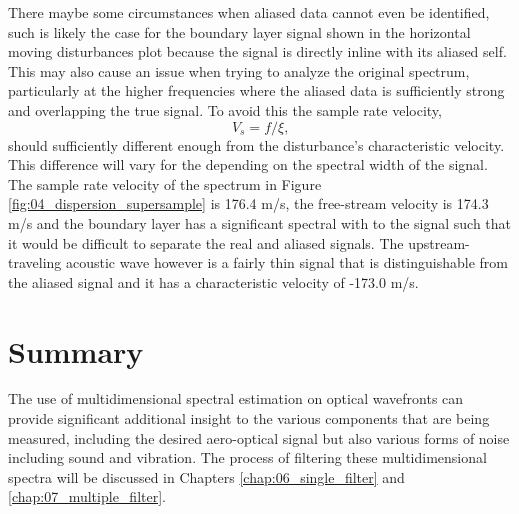 There maybe some circumstances when aliased data cannot even be identified, such is likely the case for the boundary layer signal shown in the horizontal moving disturbances plot because the signal is directly inline with its aliased self.
This may also cause an issue when trying to analyze the original spectrum, particularly at the higher frequencies where the aliased data is sufficiently strong and overlapping the true signal.
To avoid this the sample rate velocity,
\begin{equation}
  V_s=f/\xi \textrm{,}
\end{equation}
should sufficiently different enough from the disturbance's characteristic velocity.
This difference will vary for the depending on the spectral width of the signal.
The sample rate velocity of the spectrum in Figure \ref{fig:04_dispersion_supersample} is 176.4 m/s, the free-stream velocity is 174.3 m/s and the boundary layer has a significant spectral with to the signal such that it would be difficult to separate the real and aliased signals.
The upstream-traveling acoustic wave however is a fairly thin signal that is distinguishable from the aliased signal and it has a characteristic velocity of -173.0 m/s.

\section{Summary}
The use of multidimensional spectral estimation on optical wavefronts can provide significant additional insight to the various components that are being measured, including the desired aero-optical signal but also various forms of noise including sound and vibration.
The process of filtering these multidimensional spectra will be discussed in Chapters \ref{chap:06_single_filter} and \ref{chap:07_multiple_filter}. 
